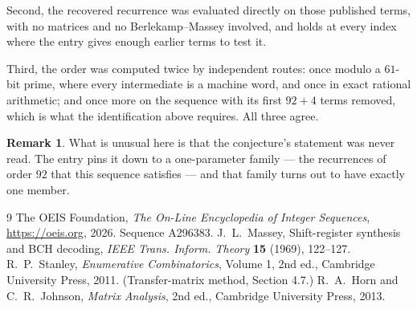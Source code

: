 \documentclass[11pt,a4paper]{article}
\theoremstyle{plain}
\theoremstyle{definition}
\newtheorem{remark}[theorem]{Remark}
\begin{document}
Second, the recovered recurrence was evaluated directly on those published terms, with no
matrices and no Berlekamp--Massey involved, and holds at every index where the entry gives
enough earlier terms to test it.

Third, the order was computed twice by independent routes: once modulo a $61$-bit prime, where
every intermediate is a machine word, and once in exact rational arithmetic; and once more on
the sequence with its first $92+4$ terms removed, which is what the identification above
requires. All three agree.

\begin{remark}
What is unusual here is that the conjecture's statement was never read. The entry pins it down
to a one-parameter family --- the recurrences of order $92$ that this sequence satisfies
--- and that family turns out to have exactly one member.
\end{remark}

\begin{thebibliography}{9}
 The OEIS Foundation, \emph{The On-Line Encyclopedia of Integer
Sequences}, \url{https://oeis.org}, 2026. Sequence A296383.
 J.~L.~Massey, Shift-register synthesis and BCH decoding, \emph{IEEE
Trans. Inform. Theory} \textbf{15} (1969), 122--127.
 R.~P.~Stanley, \emph{Enumerative Combinatorics}, Volume 1, 2nd ed.,
Cambridge University Press, 2011. (Transfer-matrix method, Section 4.7.)
 R.~A.~Horn and C.~R.~Johnson, \emph{Matrix Analysis}, 2nd ed., Cambridge
University Press, 2013.
\end{thebibliography}
\end{document}
